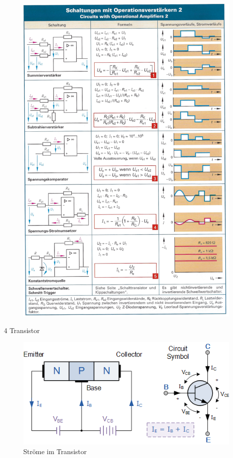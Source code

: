 \documentclass[a5paper, 12pt, twoside]{scrartcl}
\begin{document}
\begin{figure}[H]
  \centering
  \includegraphics[width=.95\textwidth]{OPV2}
\end{figure}

{\Large 4 Transistor}

\begin{figure}[H]
  \centering
  \includegraphics[width=.6\textwidth]{Transistor}
  \caption{Ströme im Transistor}
\end{figure}
\end{document}
